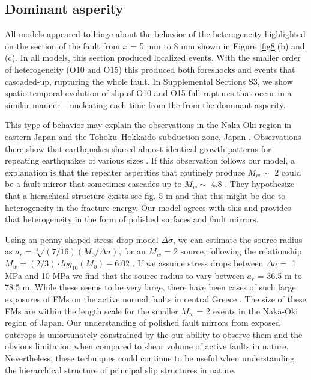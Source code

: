 \documentclass[preprint,1p, 10pt,authoryear]{elsarticle}
\begin{document}
\subsection{Dominant asperity}
All models appeared to hinge about the behavior of the heterogeneity highlighted on the section of the fault from $x$ = 5 mm to 8 mm shown in Figure \ref{fig8}(b) and (c). In all models, this section produced localized events. With the smaller order of heterogeneity (O10 and O15) this produced both foreshocks and events that cascaded-up, rupturing the whole fault. In Supplemental Sections S3, we show spatio-temporal evolution of slip of O10 and O15 full-ruptures that occur in a similar manner -- nucleating each time from the from the dominant asperity.

This type of behavior may explain the observations in the Naka-Oki region in eastern Japan \citep{Okuda2018} and the Tohoku–Hokkaido subduction zone, Japan \citep{Ide2019}. Observations there show that earthquakes shared almost identical growth patterns for repeating earthquakes of various sizes . If this observation follows our model, a explanation is that the repeater asperities that routinely produce  $M_{w} \sim$ 2  could be a fault-mirror that sometimes cascades-up to  $M_{w} \sim$ 4.8 \citep{Okuda2018a}.  They hypothesize that a hierachical structure exists see fig. 5 in \citet{Okuda2018} and that this might be due to heterogeneity in the fracture energy.  Our model agrees with this and provides that heterogeneity in the form of polished surfaces and fault mirrors. 

Using an penny-shaped \citet{Eshelby1957} stress drop model $\Delta\sigma$, we can estimate the source radius as $a_{r} = \sqrt[3]{(7/16)(M_{0}/\Delta\sigma)}$, for an $M_{w}$ = 2 source, following the relationship $M_{w} = (2/3)\cdot log_{10}(M_{0}) - 6.02$ \citep{Kanamori1975}. If we assume stress drops between $\Delta \sigma  = $ 1 MPa and 10 MPa we find that the source radius to vary between $a_{r}$ = 36.5 m to 78.5 m.  While these seems to be very large, there have been cases of such large exposures of FMs on the active normal faults in central Greece \citep{Jackson1999}. The size of these FMs are within the length scale for the smaller $M_{w}$ = 2 events in the Naka-Oki region of Japan. Our understanding of polished fault mirrors from exposed outcrops is unfortunately constrained by the our ability to observe them and the obvious limitation when compared to shear volume of active faults in nature.  Nevertheless, these techniques could continue to be useful when understanding the hierarchical structure of principal slip structures in nature.
\end{document}
